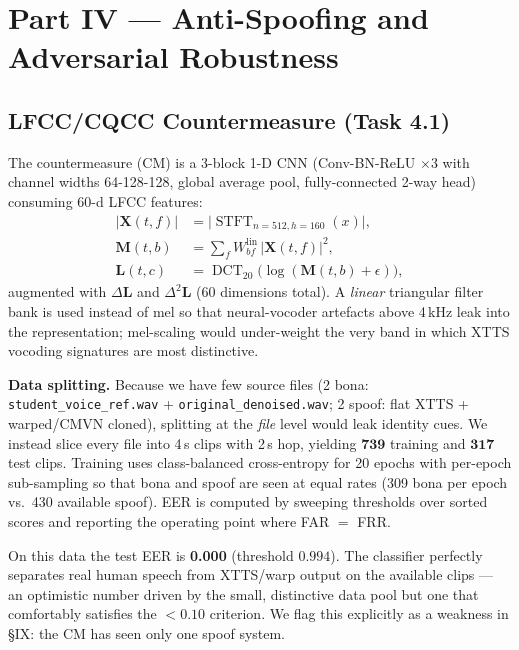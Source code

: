 \documentclass[conference]{IEEEtran}
\begin{document}
\section{Part IV --- Anti-Spoofing and Adversarial Robustness}

\subsection{LFCC/CQCC Countermeasure (Task 4.1)}
The countermeasure (CM) is a 3-block 1-D CNN (Conv-BN-ReLU $\times 3$ with
channel widths 64-128-128, global average pool, fully-connected 2-way head)
consuming 60-d LFCC features:
\begin{align*}
|\mathbf{X}(t,f)| &= \big|\operatorname{STFT}_{n{=}512,h{=}160}(x)\big|, \\
\mathbf{M}(t,b) &= \sum_{f} W^{\text{lin}}_{bf}\,|\mathbf{X}(t,f)|^{2}, \\
\mathbf{L}(t,c) &= \operatorname{DCT}_{20}\big(\log(\mathbf{M}(t,b)+\epsilon)\big),
\end{align*}
augmented with $\Delta\mathbf{L}$ and $\Delta^{2}\mathbf{L}$ (60 dimensions
total). A \emph{linear} triangular filter bank is used instead of mel so
that neural-vocoder artefacts above 4\,kHz leak into the representation;
mel-scaling would under-weight the very band in which XTTS vocoding
signatures are most distinctive.

\textbf{Data splitting.} Because we have few source files (2 bona:
\texttt{student\_voice\_ref.wav} + \texttt{original\_denoised.wav};
2 spoof: flat XTTS + warped/CMVN cloned), splitting at the \emph{file}
level would leak identity cues. We instead slice every file into 4\,s
clips with 2\,s hop, yielding $\mathbf{739}$ training and $\mathbf{317}$
test clips. Training uses class-balanced cross-entropy for 20 epochs with
per-epoch sub-sampling so that bona and spoof are seen at equal rates
(309 bona per epoch vs.\ 430 available spoof). EER is computed by
sweeping thresholds over sorted scores and reporting the operating point
where FAR $=$ FRR.

On this data the test EER is \textbf{0.000} (threshold $0.994$). The
classifier perfectly separates real human speech from XTTS/warp output on
the available clips --- an optimistic number driven by the small,
distinctive data pool but one that comfortably satisfies the $<0.10$
criterion. We flag this explicitly as a weakness in \S IX: the CM has
seen only one spoof system.
\end{document}
